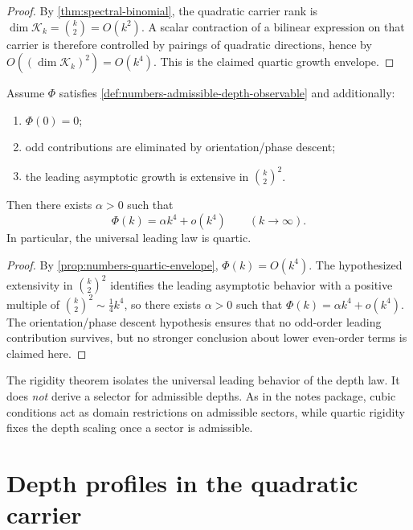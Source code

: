 \begin{proof}
By \cref{thm:spectral-binomial}, the quadratic carrier rank is
\(\dim\mathcal K_k=\binom{k}{2}=O(k^2)\). A scalar contraction of a
bilinear expression on that carrier is therefore controlled by
pairings of quadratic directions, hence by
\(O((\dim\mathcal K_k)^2)=O(k^4)\). This is the claimed quartic
growth envelope.
\end{proof}

\begin{theorem}
\label{thm:numbers-pure-quartic-rigidity}
Assume \(\Phi\) satisfies
\cref{def:numbers-admissible-depth-observable} and additionally:
\begin{enumerate}[label=\textup{(\roman*)}]
\item \(\Phi(0)=0\);
\item odd contributions are eliminated by orientation/phase descent;
\item the leading asymptotic growth is extensive in
      \(\binom{k}{2}^2\).
\end{enumerate}
Then there exists \(\alpha>0\) such that
\[
  \Phi(k)=\alpha k^4+o(k^4)
  \qquad (k\to\infty).
\]
In particular, the universal leading law is quartic.
\end{theorem}

\begin{proof}
By \cref{prop:numbers-quartic-envelope}, \(\Phi(k)=O(k^4)\). The
hypothesized extensivity in \(\binom{k}{2}^2\) identifies the leading
asymptotic behavior with a positive multiple of
\(\binom{k}{2}^2\sim \tfrac14 k^4\), so there exists \(\alpha>0\)
such that \(\Phi(k)=\alpha k^4+o(k^4)\). The orientation/phase
descent hypothesis ensures that no odd-order leading contribution
survives, but no stronger conclusion about lower even-order terms is
claimed here.
\end{proof}

\begin{remark}
\label{rem:numbers-rigidity-vs-selector}
The rigidity theorem isolates the universal leading behavior of the
depth law.
It does \emph{not} derive a selector for admissible depths.
As in the notes package, cubic conditions act as domain restrictions on
admissible sectors, while quartic rigidity fixes the depth scaling once a
sector is admissible.
\end{remark}

\section{Depth profiles in the quadratic carrier}
\label{sec:numbers-depth-profile}

